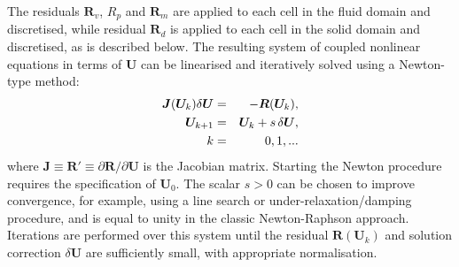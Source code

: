 \documentclass[sn-mathphys,Numbered]{sn-jnl}%
\newcommand{\bb}{\boldsymbol}
\begin{document}
The residuals $\bb{R}_v$, $R_p$ and $\bb{R}_m$ are applied to each cell in the fluid domain and discretised, while residual $\bb{R}_d$ is applied to each cell in the solid domain and discretised, as is described below.
The resulting system of coupled nonlinear equations in terms of $\bb{U}$ can be linearised and iteratively solved using a Newton-type method:
\begin{eqnarray} \label{eq:NewtonRaphson}
	\bb{J}(\bb{U}_k) \delta \bb{U} &=& -\bb{R}(\bb{U}_k), \notag \\
	\bb{U}_{k+1} &=& \bb{U}_k + s \, \delta \bb{U}, \notag \\
	\quad
	k &=& 0,1,...
\end{eqnarray}
where $\bb{J} \equiv \bb{R}' \equiv \partial \bb{R}/\partial \bb{U}$ is the Jacobian matrix.
Starting the Newton procedure requires the specification of $\bb{U}_0$.
The scalar $s > 0$ can be chosen to improve convergence, for example, using a line search or under-relaxation/damping procedure, and is equal to unity in the classic Newton-Raphson approach.
Iterations are performed over this system until the residual $\bb{R}(\bb{U}_k)$ and solution correction $\delta \bb{U}$ are sufficiently small, with appropriate normalisation.
\end{document}
